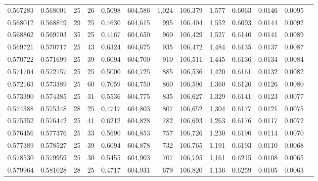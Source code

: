 \begin{tabular}{rrrrrrrrrrrrr}
0.567283 & 0.568001 &    25 &  26 &                                     0.5098 & 604,586 &   1,024 & 106,379 &   1,577 & 0.6063 & 0.0146 & 0.0095 \\
0.568012 & 0.568849 &    29 &  25 &                                     0.4630 & 604,615 &     995 & 106,404 &   1,552 & 0.6093 & 0.0144 & 0.0092 \\
0.568862 & 0.569703 &    35 &  25 &                                     0.4167 & 604,650 &     960 & 106,429 &   1,527 & 0.6140 & 0.0141 & 0.0089 \\
0.569721 & 0.570717 &    25 &  43 &                                     0.6324 & 604,675 &     935 & 106,472 &   1,484 & 0.6135 & 0.0137 & 0.0087 \\
0.570722 & 0.571699 &    25 &  39 &                                     0.6094 & 604,700 &     910 & 106,511 &   1,445 & 0.6136 & 0.0134 & 0.0084 \\
0.571704 & 0.572157 &    25 &  25 &                                     0.5000 & 604,725 &     885 & 106,536 &   1,420 & 0.6161 & 0.0132 & 0.0082 \\
0.572163 & 0.573389 &    25 &  60 &                                     0.7059 & 604,750 &     860 & 106,596 &   1,360 & 0.6126 & 0.0126 & 0.0080 \\
0.573390 & 0.574385 &    25 &  31 &                                     0.5536 & 604,775 &     835 & 106,627 &   1,329 & 0.6141 & 0.0123 & 0.0077 \\
0.574388 & 0.575348 &    28 &  25 &                                     0.4717 & 604,803 &     807 & 106,652 &   1,304 & 0.6177 & 0.0121 & 0.0075 \\
0.575352 & 0.576442 &    25 &  41 &                                     0.6212 & 604,828 &     782 & 106,693 &   1,263 & 0.6176 & 0.0117 & 0.0072 \\
0.576456 & 0.577376 &    25 &  33 &                                     0.5690 & 604,853 &     757 & 106,726 &   1,230 & 0.6190 & 0.0114 & 0.0070 \\
0.577389 & 0.578527 &    25 &  39 &                                     0.6094 & 604,878 &     732 & 106,765 &   1,191 & 0.6193 & 0.0110 & 0.0068 \\
0.578530 & 0.579959 &    25 &  30 &                                     0.5455 & 604,903 &     707 & 106,795 &   1,161 & 0.6215 & 0.0108 & 0.0065 \\
0.579964 & 0.581028 &    28 &  25 &                                     0.4717 & 604,931 &     679 & 106,820 &   1,136 & 0.6259 & 0.0105 & 0.0063 \\

\end{tabular}
